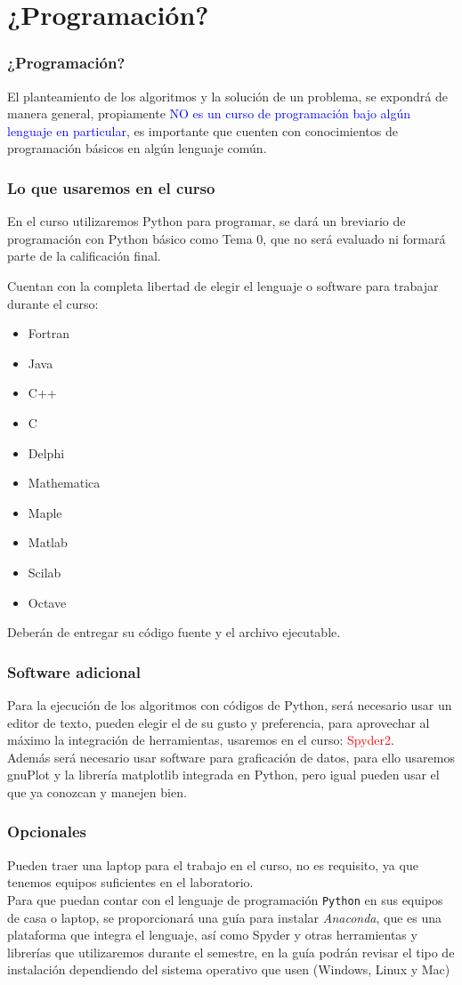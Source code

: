 \documentclass[12pt]{beamer}
\begin{document}
\section{¿Programación?}
\begin{frame}
\frametitle{¿Programación?}
El planteamiento de los algoritmos y la solución de un problema, se expondrá de manera general, propiamente \textcolor{blue}{NO es un curso de programación bajo algún lenguaje en particular}, es importante que cuenten con conocimientos de programación básicos en algún lenguaje común.
\end{frame}
\begin{frame}
\frametitle{Lo que usaremos en el curso}
En el curso utilizaremos Python para programar, se dará un breviario de programación con Python básico como Tema 0, que no será evaluado ni formará parte de la calificación final.
\end{frame}
\begin{frame}
Cuentan con la completa libertad de elegir el lenguaje o software para trabajar durante el curso:
\begin{multicols}{2}
\begin{itemize}
\item Fortran
\item Java
\item C++
\item C
\item Delphi
\item Mathematica
\item Maple
\item Matlab
\item Scilab
\item Octave
\end{itemize}
\end{multicols}
Deberán de entregar su código fuente y el archivo ejecutable.
\end{frame}
\begin{frame}
\frametitle{Software adicional}
Para la ejecución de los algoritmos con códigos de Python, será necesario usar un editor de texto, pueden elegir el de su gusto y preferencia, para aprovechar al máximo la integración de herramientas, usaremos en el curso: \textcolor{red}{Spyder2}.
\\
\bigskip
Además será necesario usar software para graficación de datos, para ello usaremos gnuPlot y la librería matplotlib integrada en Python, pero igual pueden usar el que ya conozcan y manejen bien.
\end{frame}
\begin{frame}
\frametitle{Opcionales}
Pueden traer una laptop para el trabajo en el curso, no es requisito, ya que tenemos equipos suficientes en el laboratorio.
\\
\medskip
Para que puedan contar con el lenguaje de programación \texttt{Python} en sus equipos de casa o laptop, se proporcionará una guía para instalar \emph{Anaconda}, que es una plataforma que integra el lenguaje, así como Spyder y otras herramientas y librerías que utilizaremos durante el semestre, en la guía podrán revisar el tipo de instalación dependiendo del sistema operativo que usen (Windows, Linux y Mac)
\end{frame}
\end{document}
